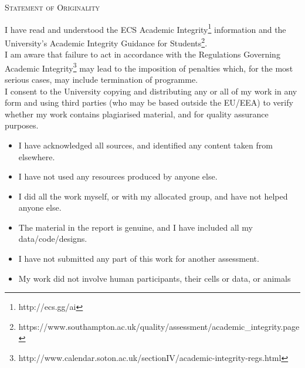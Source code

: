 \documentclass[12pt]{report}
\begin{document}


\newpage


\begin{center}
    \textsc{\LARGE Statement of Originality} \\ [1cm]
\end{center}
I have read and understood the ECS Academic Integrity\footnote{http://ecs.gg/ai} information and the University’s
Academic Integrity Guidance for Students\footnote{https://www.southampton.ac.uk/quality/assessment/academic\_integrity.page}.
\\[0.3cm]
I am aware that failure to act in accordance with the Regulations Governing Academic Integrity\footnote{http://www.calendar.soton.ac.uk/sectionIV/academic-integrity-regs.html}
may lead to the imposition of penalties which, for the most serious cases, may include
termination of programme.
\\[0.3cm]
I consent to the University copying and distributing any or all of my work in any form and
using third parties (who may be based outside the EU/EEA) to verify whether my work
contains plagiarised material, and for quality assurance purposes.
\\[0.5cm]

\begin{itemize}
    \item I have acknowledged all sources, and identified any content taken from elsewhere.
    \item I have not used any resources produced by anyone else.
    \item I did all the work myself, or with my allocated group, and have not helped anyone else.
    \item The material in the report is genuine, and I have included all my data/code/designs.
    \item I have not submitted any part of this work for another assessment.
    \item My work did not involve human participants, their cells or data, or animals
\end{itemize}

\newpage
\end{document}
